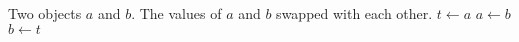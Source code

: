 
\begin{algorithmic}[1]
\Require Two objects $a$ and $b$.
\Ensure The values of $a$ and $b$ swapped with each other.
\State $t \gets a$
\State $a \gets b$
\State $b \gets t$
\end{algorithmic}
